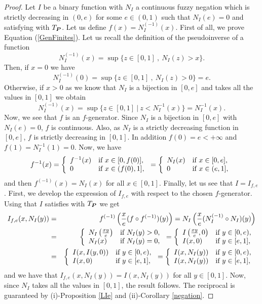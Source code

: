 \begin{proof}
	Let $I$ be a binary function with $N_I$ a continuous fuzzy negation which is strictly decreasing in $(0,e)$ for some $e \in (0,1)$ such that $N_I(e)=0$ and satisfying \LIey with $T_{\bm{P}}$. Let us define $f(x)=N_{I}^{(-1)}(x)$. First of all, we prove Equation (\ref{GenFinites}). Let us recall the definition of the pseudoinverse of a function
	$$N_I^{(-1)}(x) = \sup\{ z \in [0,1] ~,~ N_I(z)>x \}.$$
	Then, if $x=0$ we have
	$$N_I^{(-1)}(0)=\sup \{ z \in [0,1] ~,~ N_I(z)>0 \}=e.$$
	Otherwise, if $x>0$ as we know that $N_I$ is a bijection in $[0,e]$ and takes all the values in $[0,1]$ we obtain
	$$ N_I^{(-1)}(x)= \sup \{ z \in [0,1] ~|~ z < N_I^{-1}(x) \}=N_I^{-1}(x).$$
	Now, we see that $f$ is an $f$-generator. Since $N_I$ is a bijection in $[0,e]$ with $N_I(e)=0$, $f$ is continuous. Also, as $N_I$ is a strictly decreasing function in $[0,e]$, $f$ is strictly decreasing in $[0,1]$. In addition $f(0)=e < + \infty$ and $f(1)=N_I^{-1}(1)=0$. Now, we have
	$$ f^{-1}(x)= \left\{\begin{array}{ll} f^{-1}(x)&\hbox{if } x \in [0,f(0)],\\ 0&\hbox{if } x \in (f(0),1] ,\end{array}\right. = 
	\left\{\begin{array}{ll} N_I(x)&\hbox{if } x \in [0,e],\\ 0&\hbox{if } x \in (e,1] ,\end{array}\right.
	$$
	and then $f^{(-1)}(x)=N_I(x)$ for all $x \in [0,1]$. Finally, let us see that $I=I_{f,e}$. First, we develop the expression of $I_{f,e}$ with respect to the chosen $f$-generator. Using that $I$ satisfies \LIey with $T_{\bm{P}}$ we get
	\begin{eqnarray*}
		I_{f,e}(x,N_I(y))&=&f^{(-1)}\left(\frac{x}{e}(f\circ f^{(-1)})(y)\right) =N_I\left(\frac{x}{e}(N_I^{(-1)} \circ N_I)(y)\right)\\
		&=& \left\{\begin{array}{ll} N_I\left(\frac{xy}{e}\right)&\hbox{if } N_I(y)>0,\\ N_I(x)&\hbox{if }N_I(y)=0 ,\end{array}\right. = \left\{\begin{array}{ll} 	I \left(\frac{xy}{e},0\right)&\hbox{if } y \in [0,e) ,\\ I(x,0) &\hbox{if }y\in [e,1] ,\end{array}\right. \\ 
		&=& \left\{\begin{array}{ll} 	I(x,I(y,0))&\hbox{if } y \in [0,e) ,\\ I(x,0) &\hbox{if }y\in [e,1] ,\end{array}\right. =
		\left\{\begin{array}{ll} 	I(x,N_I(y)) &\hbox{if } y \in [0,e) ,\\ I(x,N_I(y)) &\hbox{if }y\in [e,1] ,\end{array}\right.
	\end{eqnarray*}
	and we have that $ I_{f,e}(x,N_I(y)) = I(x,N_I(y))$ for all $y \in [0,1]$. Now, since $N_I$ takes all the values in $[0,1]$, the result follows.
	The reciprocal is guaranteed by (i)-Proposition \ref{LIe} and (ii)-Corollary \ref{negation}.
\end{proof}
